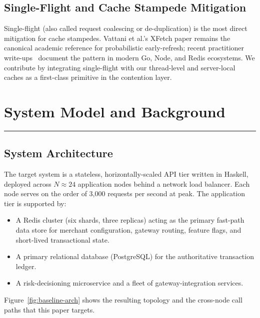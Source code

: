 \documentclass[12pt,a4paper,oneside]{report}
\begin{document}
\section[Single-Flight \& Stampede]{Single-Flight and Cache Stampede Mitigation}
Single-flight (also called request coalescing or de-duplication) is the most direct mitigation for cache stampedes. Vattani et al.'s XFetch paper remains the canonical academic reference for probabilistic early-refresh; recent practitioner write-ups~\cite{1xapi2026singleflight, oneuptime2026stampede, oneuptime2026coalescing} document the pattern in modern Go, Node, and Redis ecosystems. We contribute by integrating single-flight with our thread-level and server-local caches as a first-class primitive in the contention layer.


\chapter{System Model and Background}
\label{chap:model}
\vspace{-1cm}
\noindent \rule{6.6in}{0.01in}

\section{System Architecture}
The target system is a stateless, horizontally-scaled API tier written in Haskell, deployed across $N \approx 24$ application nodes behind a network load balancer. Each node serves on the order of 3{,}000 requests per second at peak. The application tier is supported by:
\begin{itemize}[leftmargin=*]
    \item A Redis cluster (six shards, three replicas) acting as the primary fast-path data store for merchant configuration, gateway routing, feature flags, and short-lived transactional state.
    \item A primary relational database (PostgreSQL) for the authoritative transaction ledger.
    \item A risk-decisioning microservice and a fleet of gateway-integration services.
\end{itemize}

\noindent Figure~\ref{fig:baseline-arch} shows the resulting topology and the cross-node call paths that this paper targets.
\end{document}

